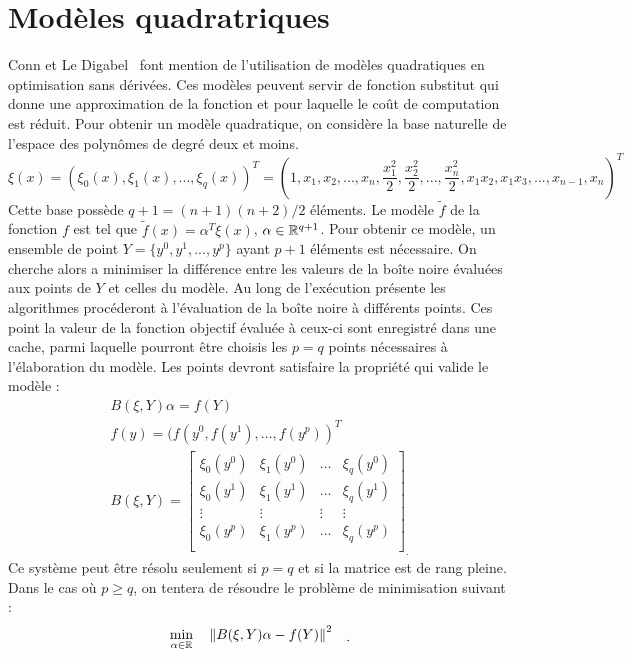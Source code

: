 \section{Modèles quadratriques}\label{sec:mod}
	Conn et Le Digabel~\cite{CoLed2011} font mention de l'utilisation de modèles quadratiques en optimisation sans dérivées. Ces modèles peuvent servir de fonction substitut qui donne une approximation de la fonction et pour laquelle le coût de computation est réduit. Pour obtenir un modèle quadratique, on considère la base naturelle de l'espace des polynômes de degré deux et moins. 
	\begin{equation*}
	\xi (x)=(\xi_0(x),\xi_1(x),...,\xi_q(x))^T = \left(1,x_1,x_2,...,x_n,\frac{x_1^2}{2},\frac{x_2^2}{2},...,\frac{x_n^2}{2},x_1 x_2, x_1 x_3,...,x_{n-1},x_{n}\right)^T
	\end{equation*}
	Cette base possède $q+1 = (n+1)(n+2)/2$ éléments. Le modèle $\tilde{f}$ de la fonction $f$ est tel que $\tilde{f}(x)=\alpha^T\xi(x)$, $\alpha \in \mathbb{R}^{q+1}$. Pour obtenir ce modèle, un ensemble de point $Y=\{y^0,y^1,...,y^p\}$ ayant $p+1$ éléments est nécessaire. On cherche alors a minimiser la différence entre les valeurs de la boîte noire évaluées aux points de $Y$ et celles du modèle. Au long de l'exécution présente les algorithmes procéderont à l'évaluation de la boîte noire à différents points. Ces point la valeur de la fonction objectif évaluée à ceux-ci sont enregistré dans une cache, parmi laquelle pourront être choisis les $p = q$ points nécessaires à l'élaboration du modèle. Les points devront satisfaire la propriété qui valide le modèle : 
	\begin{gather*}
	B(\xi,Y)\alpha = f(Y)\\
	f(y)=(f(y^0,f(y^1),...,f(y^p))^T\\
	B(\xi,Y) = 
	\begin{bmatrix}
	\xi_0(y^0) & \xi_1(y^0) & \dots & \xi_q(y^0)\\
	\xi_0(y^1) & \xi_1(y^1) & \dots & \xi_q(y^1)\\
	\vdots & \vdots & \vdots & \vdots\\
	\xi_0(y^p) & \xi_1(y^p) & \dots & \xi_q(y^p)\\
	\end{bmatrix}_.
	\end{gather*}
	Ce système peut être résolu seulement si $p=q$ et si la matrice est de rang pleine. Dans le cas où $p\geq q$, on tentera de résoudre le problème de minimisation suivant : 
	\begin{equation*}
	\begin{aligned}
	& \underset{\alpha \in \mathbb{R}}{\text{min}}
	& & \left\lVert B(\xi,Y)\alpha -f(Y)\right\rVert^2
	\end{aligned}.
	\end{equation*}
